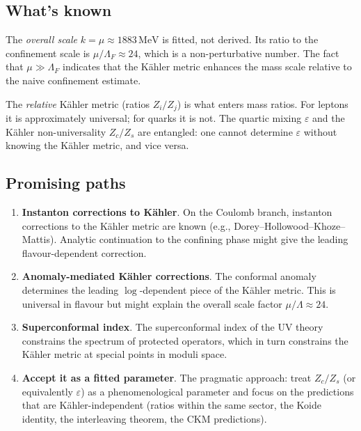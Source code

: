 \documentclass[12pt,a4paper]{article}
\newcommand{\MeV}{\,\mathrm{MeV}}
\begin{document}
\subsection{What's known}

The \emph{overall scale} $k = \mu \approx 1883\MeV$ is fitted, not derived.
Its ratio to the confinement scale is $\mu/\Lambda_F \approx 24$, which is a
non-perturbative number.  The fact that $\mu \gg \Lambda_F$ indicates that
the K\"ahler metric enhances the mass scale relative to the naive confinement
estimate.

The \emph{relative} K\"ahler metric (ratios $Z_i/Z_j$) is what enters
mass ratios.  For leptons it is approximately universal; for quarks it
is not.  The quartic mixing $\varepsilon$ and the K\"ahler non-universality
$Z_c/Z_s$ are entangled: one cannot determine $\varepsilon$ without knowing
the K\"ahler metric, and vice versa.

\subsection{Promising paths}

\begin{enumerate}[label=(\alph*)]
\item \textbf{Instanton corrections to K\"ahler}.  On the Coulomb branch,
  instanton corrections to the K\"ahler metric are known (e.g.,
  Dorey--Hollowood--Khoze--Mattis).  Analytic continuation to the
  confining phase might give the leading flavour-dependent correction.

\item \textbf{Anomaly-mediated K\"ahler corrections}.  The conformal
  anomaly determines the leading $\log$-dependent piece of the K\"ahler
  metric.  This is universal in flavour but might explain the overall
  scale factor $\mu/\Lambda \approx 24$.

\item \textbf{Superconformal index}.  The superconformal index of the
  UV theory constrains the spectrum of protected operators, which in
  turn constrains the K\"ahler metric at special points in moduli space.

\item \textbf{Accept it as a fitted parameter}.  The pragmatic approach:
  treat $Z_c/Z_s$ (or equivalently $\varepsilon$) as a phenomenological
  parameter and focus on the predictions that are K\"ahler-independent
  (ratios within the same sector, the Koide identity, the interleaving
  theorem, the CKM predictions).
\end{enumerate}
\end{document}
